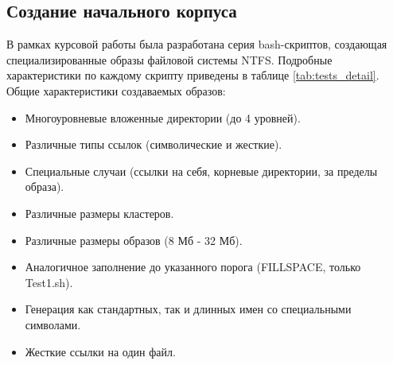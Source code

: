 \subsection{Создание начального корпуса}

В рамках курсовой работы была разработана серия bash-скриптов, создающая специализированные образы файловой системы NTFS. Подробные характеристики по каждому скрипту приведены в таблице \ref{tab:tests_detail}. Общие характеристики создаваемых образов:
\begin{itemize}
	\item Многоуровневые вложенные директории (до 4 уровней).
	\item Различные типы ссылок (символические и жесткие).
	\item Специальные случаи (ссылки на себя, корневые директории, за пределы образа).
	\item Различные размеры кластеров.
	\item Различные размеры образов (8 Мб - 32 Мб).
	\item Аналогичное заполнение до указанного порога (FILLSPACE, только Test1.sh).
	\item Генерация как стандартных, так и длинных имен со специальными символами.
	\item Жесткие ссылки на один файл.
\end{itemize} 

